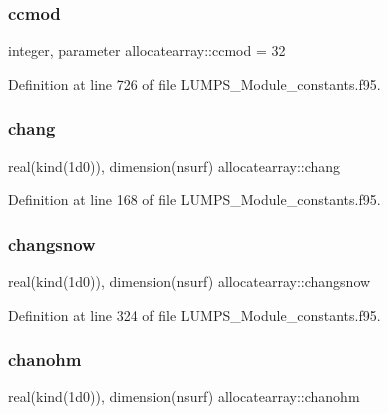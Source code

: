 \subsubsection{\texorpdfstring{ccmod}{ccmod}}
{\footnotesize\ttfamily integer, parameter allocatearray\+::ccmod = 32}



Definition at line 726 of file L\+U\+M\+P\+S\+\_\+\+Module\+\_\+constants.\+f95.

\mbox{\label{namespaceallocatearray_a2c176341a882c22aab3f1b01844f4fa0}} 
\subsubsection{\texorpdfstring{chang}{chang}}
{\footnotesize\ttfamily real(kind(1d0)), dimension(nsurf) allocatearray\+::chang}



Definition at line 168 of file L\+U\+M\+P\+S\+\_\+\+Module\+\_\+constants.\+f95.

\mbox{\label{namespaceallocatearray_a215dffcb1ced9f49787128f695cbf8d7}} 
\subsubsection{\texorpdfstring{changsnow}{changsnow}}
{\footnotesize\ttfamily real(kind(1d0)), dimension(nsurf) allocatearray\+::changsnow}



Definition at line 324 of file L\+U\+M\+P\+S\+\_\+\+Module\+\_\+constants.\+f95.

\mbox{\label{namespaceallocatearray_a10d39115371a0bd3c9a9fc9d4bc7fb2f}} 
\subsubsection{\texorpdfstring{chanohm}{chanohm}}
{\footnotesize\ttfamily real(kind(1d0)), dimension(nsurf) allocatearray\+::chanohm}



